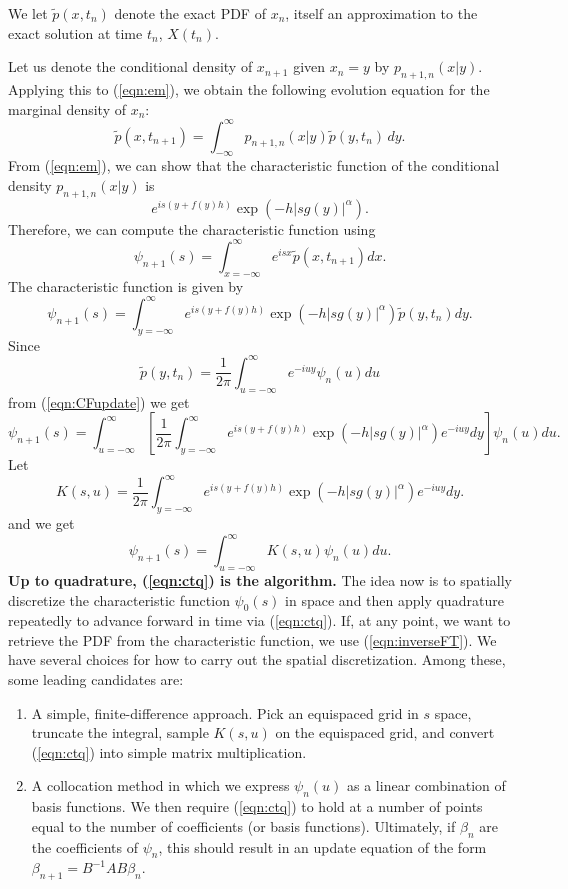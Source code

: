\documentclass[11pt,letterpaper]{article}
\begin{document}
We let $\tilde{p}(x,t_n)$ denote the exact PDF of $x_n$, itself an approximation to the exact solution at time $t_n$, $X(t_n)$.

Let us denote the conditional density of $x_{n+1}$ given $x_n = y$ by $p_{n+1, n}(x | y)$.  Applying this to (\ref{eqn:em}), we obtain the following evolution equation for the marginal density of $x_n$:
\begin{equation}
\label{dtq}
\tilde{p}(x, t_{n+1})=\int_{-\infty}^\infty p_{n+1, n}(x | y ) \tilde{p}(y, t_n) \, dy.
\end{equation}
\noindent
From (\ref{eqn:em}), we can show that the characteristic function of the conditional density $p_{n+1, n}(x | y )$  is
$$
e^{is \left(y+ f(y)h \right)}\exp (- h |s g(y)|^{\alpha} ).
$$
Therefore, we can compute the characteristic function using
$$
\psi_{n+1}(s) = \int_{x=-\infty}^{\infty}e^{isx}\tilde{p}(x,t_{n+1})dx.
$$
The characteristic function is given by
\begin{equation}
\label{eqn:CFupdate}
\psi_{n+1}(s) = \int_{y=-\infty}^{\infty}e^{is\left(y+f(y)h\right)}\exp{\left(  -h |s g(y)|^{\alpha} \right)}\tilde{p}(y, t_n) dy.
\end{equation}
Since
\begin{equation}
\label{eqn:inverseFT}
\tilde{p}(y, t_n) = \frac{1}{2\pi}\int_{u=-\infty}^{\infty}e^{-iuy}\psi_{n}(u)du
\end{equation}
from (\ref{eqn:CFupdate}) we get
\begin{equation}
\psi_{n+1}(s) =  \int_{u=-\infty}^{\infty}\left[\frac{1}{2\pi}\int_{y=-\infty}^{\infty}e^{is\left(y+f(y)h\right)}\exp{\left(  -h |s g(y)|^{\alpha} \right)}e^{-iuy}dy \right]\psi_{n}(u) du.\nonumber
\end{equation}
Let
$$
K(s,u) = \frac{1}{2\pi}\int_{y=-\infty}^{\infty}e^{is\left(y+f(y)h\right)}\exp{\left(  -h |s g(y)|^{\alpha} \right)}e^{-iuy}dy.
$$
and we get
\begin{equation}
\label{eqn:ctq}
\psi_{n+1}(s) =  \int_{u=-\infty}^{\infty}K(s,u)\psi_{n}(u) du.
\end{equation}
\textbf{Up to quadrature, (\ref{eqn:ctq}) is the algorithm.} The idea now is to spatially discretize the characteristic function $\psi_0(s)$ in space and then apply quadrature repeatedly to advance forward in time via (\ref{eqn:ctq}).  If, at any point, we want to retrieve the PDF from the characteristic function, we use (\ref{eqn:inverseFT}).
We have several choices for how to carry out the spatial discretization.  Among these, some leading candidates are:
\begin{enumerate}
\item A simple, finite-difference approach. Pick an equispaced grid in $s$ space, truncate the integral, sample $K(s,u)$ on the equispaced grid, and convert (\ref{eqn:ctq}) into simple matrix multiplication.
\item A collocation method in which we express $\psi_n(u)$ as a linear combination of basis functions.  We then require (\ref{eqn:ctq}) to hold at a number of points equal to the number of coefficients (or basis functions).  Ultimately, if $\beta_n$ are the coefficients of $\psi_n$, this should result in an update equation of the form $\beta_{n+1} = B^{-1} A B \beta_n$.
\end{enumerate}
\end{document}
